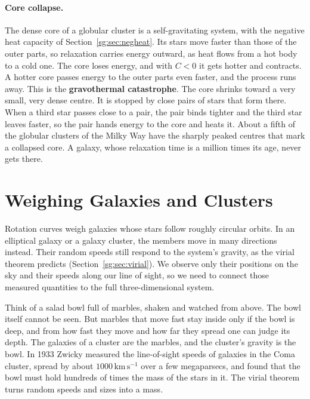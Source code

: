 \paragraph{Core collapse.} The dense core of a globular cluster is a self-gravitating system, with the negative heat capacity of Section~\ref{sg:sec:negheat}. Its stars move faster than those of the outer parts, so relaxation carries energy outward, as heat flows from a hot body to a cold one. The core loses energy, and with $C<0$ it gets hotter and contracts. A hotter core passes energy to the outer parts even faster, and the process runs away. This is the \textbf{gravothermal catastrophe}. The core shrinks toward a very small, very dense centre. It is stopped by close pairs of stars that form there. When a third star passes close to a pair, the pair binds tighter and the third star leaves faster, so the pair hands energy to the core and heats it. About a fifth of the globular clusters of the Milky Way have the sharply peaked centres that mark a collapsed core. A galaxy, whose relaxation time is a million times its age, never gets there.

\section{Weighing Galaxies and Clusters}
\label{ga:sec:weighing}

Rotation curves weigh galaxies whose stars follow roughly circular orbits. In an elliptical galaxy or a galaxy cluster, the members move in many directions instead. Their random speeds still respond to the system's gravity, as the virial theorem predicts (Section~\ref{sg:sec:virial}). We observe only their positions on the sky and their speeds along our line of sight, so we need to connect those measured quantities to the full three-dimensional system.

Think of a salad bowl full of marbles, shaken and watched from above. The bowl itself cannot be seen. But marbles that move fast stay inside only if the bowl is deep, and from how fast they move and how far they spread one can judge its depth. The galaxies of a cluster are the marbles, and the cluster's gravity is the bowl. In 1933 Zwicky measured the line-of-sight speeds of galaxies in the Coma cluster, spread by about $1000\,\mathrm{km\,s^{-1}}$ over a few megaparsecs, and found that the bowl must hold hundreds of times the mass of the stars in it. The virial theorem turns random speeds and sizes into a mass.

